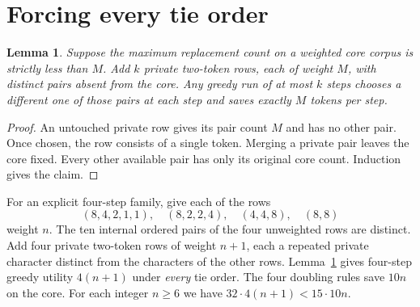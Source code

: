 \documentclass[11pt]{article}
\newtheorem{lemma}[theorem]{Lemma}
\begin{document}
\section{Forcing every tie order}
\begin{lemma}\label{lem:decoy}
Suppose the maximum replacement count on a weighted core corpus is strictly less than $M$. Add $k$ private two-token rows, each of weight $M$, with distinct pairs absent from the core. Any greedy run of at most $k$ steps chooses a different one of those pairs at each step and saves exactly $M$ tokens per step.
\end{lemma}
\begin{proof}
An untouched private row gives its pair count $M$ and has no other pair. Once chosen, the row consists of a single token. Merging a private pair leaves the core fixed. Every other available pair has only its original core count. Induction gives the claim.
\end{proof}

For an explicit four-step family, give each of the rows
\[
(8,4,2,1,1),\quad(8,2,2,4),\quad(4,4,8),\quad(8,8)
\]
weight $n$. The ten internal ordered pairs of the four unweighted rows are distinct. Add four private two-token rows of weight $n+1$, each a repeated private character distinct from the characters of the other rows. Lemma~\ref{lem:decoy} gives four-step greedy utility $4(n+1)$ under \emph{every} tie order. The four doubling rules save $10n$ on the core. For each integer $n\ge6$ we have $32\cdot4(n+1)<15\cdot10n$.
\end{document}
